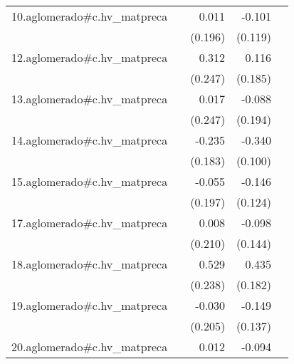{\begin{longtable}{l*{4}{D{.}{.}{-1}}}
\addlinespace
10.aglomerado#c.hv\_matpreca&                     &       0.011         &      -0.101         &                     \\
            &                     &     (0.196)         &     (0.119)         &                     \\
\addlinespace
12.aglomerado#c.hv\_matpreca&                     &       0.312         &       0.116         &                     \\
            &                     &     (0.247)         &     (0.185)         &                     \\
\addlinespace
13.aglomerado#c.hv\_matpreca&                     &       0.017         &      -0.088         &                     \\
            &                     &     (0.247)         &     (0.194)         &                     \\
\addlinespace
14.aglomerado#c.hv\_matpreca&                     &      -0.235         &      -0.340\sym{***}&                     \\
            &                     &     (0.183)         &     (0.100)         &                     \\
\addlinespace
15.aglomerado#c.hv\_matpreca&                     &      -0.055         &      -0.146         &                     \\
            &                     &     (0.197)         &     (0.124)         &                     \\
\addlinespace
17.aglomerado#c.hv\_matpreca&                     &       0.008         &      -0.098         &                     \\
            &                     &     (0.210)         &     (0.144)         &                     \\
\addlinespace
18.aglomerado#c.hv\_matpreca&                     &       0.529\sym{*}  &       0.435\sym{*}  &                     \\
            &                     &     (0.238)         &     (0.182)         &                     \\
\addlinespace
19.aglomerado#c.hv\_matpreca&                     &      -0.030         &      -0.149         &                     \\
            &                     &     (0.205)         &     (0.137)         &                     \\
\addlinespace
20.aglomerado#c.hv\_matpreca&                     &       0.012         &      -0.094         &                     \\

\end{longtable}}
